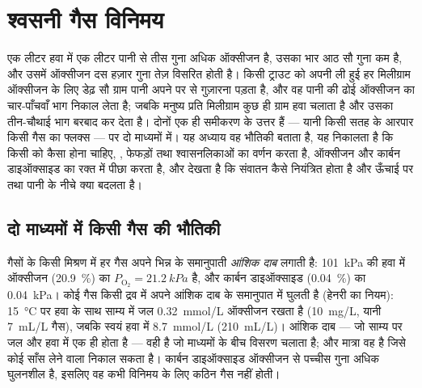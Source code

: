 \chapter{श्वसनी गैस विनिमय}\label{ch:b1:gas-exchange}

एक लीटर हवा में एक लीटर पानी से तीस गुना अधिक ऑक्सीजन है, उसका भार आठ सौ
गुना कम है, और उसमें ऑक्सीजन दस हज़ार गुना तेज़ विसरित होती है। किसी
ट्राउट को अपनी ली हुई हर मिलीग्राम ऑक्सीजन के लिए डेढ़ सौ ग्राम पानी अपने
 पर से गुज़ारना पड़ता है, और वह पानी की ढोई ऑक्सीजन का चार-पाँचवाँ
भाग निकाल लेता है; जबकि मनुष्य प्रति मिलीग्राम कुछ ही ग्राम हवा चलाता है
और उसका तीन-चौथाई भाग बरबाद कर देता है। दोनों  एक ही समीकरण के उत्तर
हैं --- यानी किसी सतह के आरपार किसी गैस का फ्लक्स --- पर दो माध्यमों में।
यह अध्याय वह भौतिकी बताता है, यह निकालता है कि किसी  को कैसा
होना चाहिए, , फेफड़ों तथा श्वासनलिकाओं का वर्णन करता है, ऑक्सीजन
और कार्बन डाइऑक्साइड का रक्त में पीछा करता है, और देखता है कि संवातन कैसे
नियंत्रित होता है और ऊँचाई पर तथा पानी के नीचे क्या बदलता है।

\section{दो माध्यमों में किसी गैस की भौतिकी}

\begin{definition}[आंशिक दाब, विलेयता]\label{def:b1:gas-exchange:partial}
गैसों के किसी मिश्रण में हर गैस अपने भिन्न के समानुपाती \emph{आंशिक दाब}
लगाती है: \qty{101}{kPa} की हवा में ऑक्सीजन
(\qty{20.9}{\%}) का $P_{\mathrm{O_2}} = \qty{21.2}{kPa}$ है, और कार्बन
डाइऑक्साइड (\qty{0.04}{\%}) का \qty{0.04}{kPa}। कोई गैस किसी द्रव में
अपने आंशिक दाब के समानुपात में घुलती है (हेनरी का नियम):
\qty{15}{\celsius} पर हवा के साथ साम्य में जल \qty{0.32}{mmol/L}
ऑक्सीजन रखता है (\qty{10}{mg/L}, यानी \qty{7}{mL/L} गैस), जबकि स्वयं
हवा में \qty{8.7}{mmol/L} (\qty{210}{mL/L})। आंशिक दाब --- जो साम्य पर
जल और हवा में एक ही होता है --- वही है जो माध्यमों के बीच विसरण चलाता है;
और मात्रा वह है जिसे कोई साँस लेने वाला निकाल सकता है। कार्बन
डाइऑक्साइड ऑक्सीजन से पच्चीस गुना अधिक घुलनशील है, इसलिए वह कभी विनिमय
के लिए कठिन गैस नहीं होती।
\end{definition}

